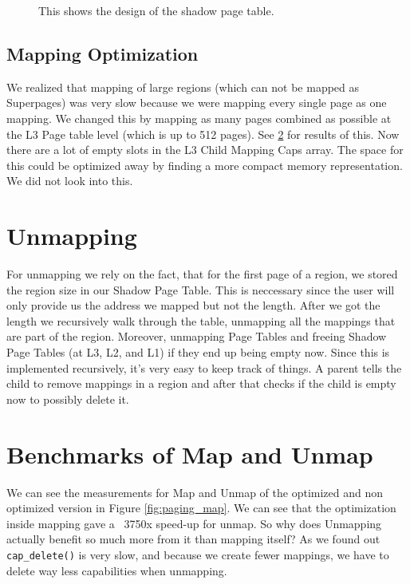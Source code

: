 \begin{figure}[ht]
    \centering
    \scalebox{0.65}{ }

    \caption{This shows the design of the shadow page table.}
    \label{fig:shadow_pt}
\end{figure}

\subsection{Mapping Optimization}

We realized that mapping of large regions (which can not be mapped as Superpages) was very slow because we were mapping every single page as one mapping. We changed this by mapping as many pages combined as possible at the L3 Page table level (which is up to 512 pages).
See \ref{sec:benchmapunmapp} for results of this. Now there are a lot of empty slots in the L3 Child Mapping Caps array. The space for this could be optimized away by finding a more compact memory representation. We did not look into this.

\section{Unmapping}
For unmapping we rely on the fact, that for the first page of a region, we stored the region size in our Shadow Page Table. This is neccessary since the user will only provide us the address we mapped but not the length. After we got the length we recursively walk through the table, unmapping all the mappings that are part of the region. Moreover, unmapping Page Tables and freeing Shadow Page Tables  (at L3, L2, and L1) if they end up being empty now. 
Since this is implemented recursively, it's very easy to keep track of things. A parent tells the child to remove mappings in a region and after that checks if the child is empty now to possibly delete it.

\section{Benchmarks of Map and Unmap}
\label{sec:benchmapunmapp}
We can see the measurements for Map and Unmap of the optimized and non optimized version in Figure \ref{fig:paging_map}. We can see that the optimization inside mapping gave a ~3750x speed-up for unmap. So why does Unmapping actually benefit so much more from it than mapping itself? As we found out \texttt{cap_delete()} is very slow, and because we create fewer mappings, we have to delete way less capabilities when unmapping.

